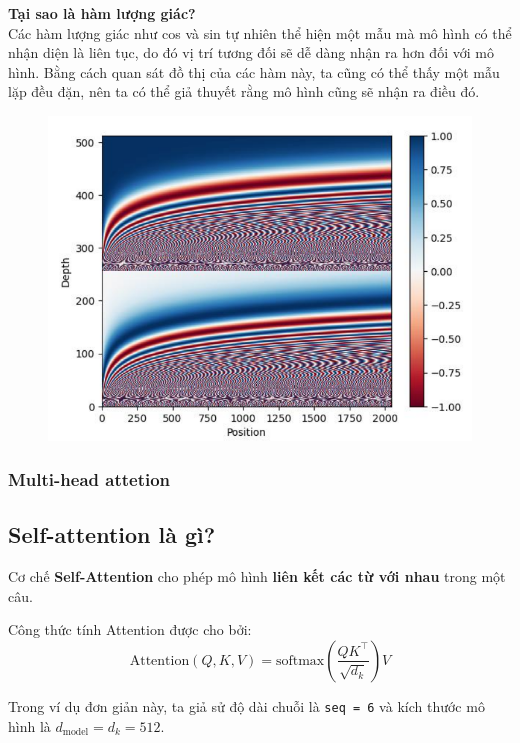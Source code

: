 \documentclass{book}
\begin{document}
            \textbf{Tại sao là hàm lượng giác?}\\
            Các hàm lượng giác như cos và sin tự nhiên thể hiện một mẫu mà mô hình có thể nhận diện là liên tục, do đó vị trí tương đối sẽ dễ dàng nhận ra hơn đối với mô hình. Bằng cách quan sát đồ thị của các hàm này, ta cũng có thể thấy một mẫu lặp đều đặn, nên ta có thể giả thuyết rằng mô hình cũng sẽ nhận ra điều đó.
            \begin{figure}[H]
                \centering
                \includegraphics[width=0.5\linewidth]{images/12d_8.png}
        
            \end{figure}
            \subsubsection{Multi-head attetion}
            \subsection*{Self-attention là gì?}
            Cơ chế \textbf{Self-Attention} cho phép mô hình \textbf{liên kết các từ với nhau} trong một câu.
            
            \bigskip
            
            Công thức tính Attention được cho bởi:
            \[
            \text{Attention}(Q, K, V) = \text{softmax}\left( \frac{QK^\top}{\sqrt{d_k}} \right) V
            \]
            
            Trong ví dụ đơn giản này, ta giả sử độ dài chuỗi là \texttt{seq = 6} và kích thước mô hình là \( d_{\text{model}} = d_k = 512 \).
            
            \bigskip
            
\end{document}
